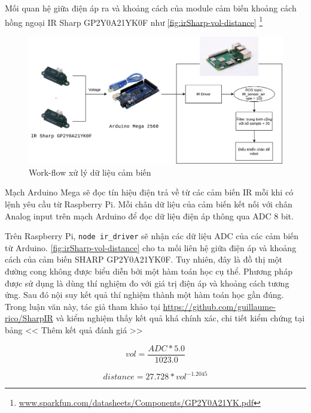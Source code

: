 Mối quan hệ giữa điện áp ra và khoảng cách của module cảm biến khoảng cách hồng ngoại IR Sharp GP2Y0A21YK0F như \figurename{\ref{fig:irSharp-vol-distance}} \footnote{\url{www.sparkfun.com/datasheets/Components/GP2Y0A21YK.pdf}}

\begin{figure}[htbp]
    \centering
    \includegraphics[width=\linewidth]{figures/ir_safety_controller-dataProcessing.png}
    \caption{Work-flow xử lý dữ liệu cảm biến}
    \label{fig:workflow-dataProcessing}
\end{figure}

Mạch Arduino Mega sẽ đọc tín hiệu điện trả về từ các cảm biến IR mỗi khi có lệnh yêu cầu từ Raspberry Pi. Mỗi chân dữ liệu của cảm biến kết nối với chân Analog input trên mạch Arduino để đọc dữ liệu điện áp thông qua ADC 8 bit.

Trên Raspberry Pi, {\tt node ir\_driver} sẽ nhận các dữ liệu ADC của các cảm biến từ Arduino. \figurename{\ref{fig:irSharp-vol-distance}} cho ta mối liên hệ giữa điện áp và khoảng cách của cảm biến SHARP GP2Y0A21YK0F. Tuy nhiên, đây là đồ thị một đường cong không được biểu diễn bởi một hàm toán học cụ thể. Phương pháp được sử dụng là dùng thí nghiệm đo với giá trị điện áp và khoảng cách tương ứng. Sau đó nội suy kết quả thí nghiệm thành một hàm toán học gần đúng. Trong luận văn này, tác giả tham khảo tại \url{https://github.com/guillaume-rico/SharpIR} và kiểm nghiệm thấy kết quả khá chính xác, chi tiết kiểm chứng tại bảng << Thêm kết quả đánh giá >>

\begin{equation}
    vol = \frac{ADC * 5.0}{1023.0}
\end{equation}

\begin{equation}
    distance = 27.728 * {vol}^{-1.2045}
\end{equation}

